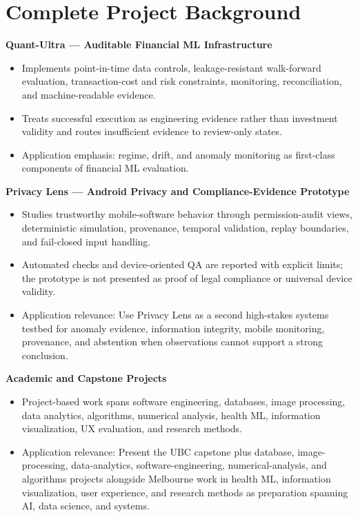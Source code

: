 \documentclass[11pt]{article}
\begin{document}
\section*{Complete Project Background}
\textbf{Quant-Ultra --- Auditable Financial ML Infrastructure}
\begin{itemize}
\item Implements point-in-time data controls, leakage-resistant walk-forward evaluation, transaction-cost and risk constraints, monitoring, reconciliation, and machine-readable evidence.
\item Treats successful execution as engineering evidence rather than investment validity and routes insufficient evidence to review-only states.
\item Application emphasis: regime, drift, and anomaly monitoring as first-class components of financial ML evaluation.
\end{itemize}

\textbf{Privacy Lens --- Android Privacy and Compliance-Evidence Prototype}
\begin{itemize}
\item Studies trustworthy mobile-software behavior through permission-audit views, deterministic simulation, provenance, temporal validation, replay boundaries, and fail-closed input handling.
\item Automated checks and device-oriented QA are reported with explicit limits; the prototype is not presented as proof of legal compliance or universal device validity.
\item Application relevance: Use Privacy Lens as a second high-stakes systems testbed for anomaly evidence, information integrity, mobile monitoring, provenance, and abstention when observations cannot support a strong conclusion.
\end{itemize}

\textbf{Academic and Capstone Projects}
\begin{itemize}
\item Project-based work spans software engineering, databases, image processing, data analytics, algorithms, numerical analysis, health ML, information visualization, UX evaluation, and research methods.
\item Application relevance: Present the UBC capstone plus database, image-processing, data-analytics, software-engineering, numerical-analysis, and algorithms projects alongside Melbourne work in health ML, information visualization, user experience, and research methods as preparation spanning AI, data science, and systems.
\end{itemize}
\end{document}

